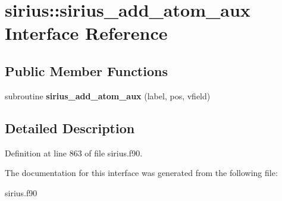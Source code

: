 \hypertarget{interfacesirius_1_1sirius__add__atom__aux}{}\section{sirius\+:\+:sirius\+\_\+add\+\_\+atom\+\_\+aux Interface Reference}
\label{interfacesirius_1_1sirius__add__atom__aux}
\subsection*{Public Member Functions}
\begin{DoxyCompactItemize}
\item 
\hypertarget{interfacesirius_1_1sirius__add__atom__aux_ae6e399eb6f1baa1b267f3660690ee88d}{}subroutine {\bfseries sirius\+\_\+add\+\_\+atom\+\_\+aux} (label, pos, vfield)\label{interfacesirius_1_1sirius__add__atom__aux_ae6e399eb6f1baa1b267f3660690ee88d}

\end{DoxyCompactItemize}


\subsection{Detailed Description}


Definition at line 863 of file sirius.\+f90.



The documentation for this interface was generated from the following file\+:\begin{DoxyCompactItemize}
\item 
sirius.\+f90\end{DoxyCompactItemize}
